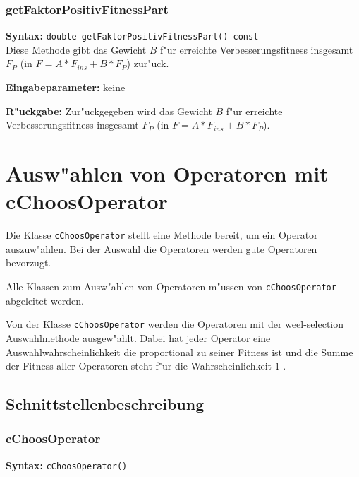 \subsubsection{getFaktorPositivFitnessPart}

\textbf{Syntax:} \verb|double getFaktorPositivFitnessPart() const| \\

Diese Methode gibt das Gewicht $B$ f"ur erreichte Verbesserungsfitness insgesamt $F_P$ (in $F=A*F_{ins}+B*F_P$) zur"uck.

\bigskip\noindent
\textbf{Eingabeparameter:} keine

\bigskip\noindent
\textbf{R"uckgabe:} Zur"uckgegeben wird das Gewicht $B$ f"ur erreichte Verbesserungsfitness insgesamt $F_P$ (in $F=A*F_{ins}+B*F_P$).



\section{Ausw"ahlen von Operatoren mit cChoosOperator}
\label{secCChoosOperator}

Die Klasse \verb|cChoosOperator| stellt eine Methode bereit, um ein Operator auszuw"ahlen. Bei der Auswahl die Operatoren werden gute Operatoren bevorzugt.

Alle Klassen zum Ausw"ahlen von Operatoren m"ussen von \verb|cChoosOperator| abgeleitet werden.

Von der Klasse \verb|cChoosOperator| werden die Operatoren mit der weel-selection Auswahlmethode ausgew"ahlt. Dabei hat jeder Operator eine Auswahlwahrscheinlichkeit die proportional zu seiner Fitness ist und die Summe der Fitness aller Operatoren steht f"ur die Wahrscheinlichkeit $1$ .


\subsection{Schnittstellenbeschreibung}

\subsubsection{cChoosOperator}

\textbf{Syntax:} \verb|cChoosOperator()| \\

